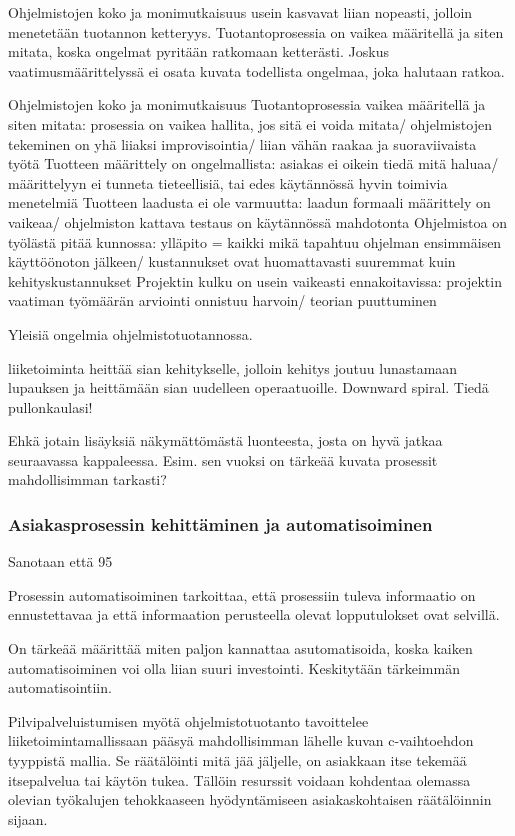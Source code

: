 \documentclass[finnish,12pt,a4paper,pdftex]{article}
\begin{document}
Ohjelmistojen koko ja monimutkaisuus usein kasvavat liian nopeasti, jolloin menetetään tuotannon ketteryys. Tuotantoprosessia on vaikea määritellä ja siten mitata, koska ongelmat pyritään ratkomaan ketterästi. Joskus vaatimusmäärittelyssä ei osata kuvata todellista ongelmaa, joka halutaan ratkoa. 

Ohjelmistojen koko ja monimutkaisuus
Tuotantoprosessia vaikea määritellä ja siten mitata: prosessia on vaikea hallita, jos sitä ei voida mitata/ ohjelmistojen tekeminen on yhä liiaksi improvisointia/ liian vähän raakaa ja suoraviivaista työtä
Tuotteen määrittely on ongelmallista: asiakas ei oikein tiedä mitä haluaa/ määrittelyyn ei tunneta tieteellisiä, tai edes käytännössä hyvin toimivia menetelmiä
Tuotteen laadusta ei ole varmuutta: laadun formaali määrittely on vaikeaa/ ohjelmiston kattava testaus on käytännössä mahdotonta
Ohjelmistoa on työlästä pitää kunnossa: ylläpito = kaikki mikä tapahtuu ohjelman ensimmäisen käyttöönoton jälkeen/ kustannukset ovat huomattavasti suuremmat kuin kehityskustannukset
Projektin kulku on usein vaikeasti ennakoitavissa: projektin vaatiman työmäärän arviointi onnistuu harvoin/ teorian puuttuminen

Yleisiä ongelmia ohjelmistotuotannossa.

liiketoiminta heittää sian kehitykselle, jolloin kehitys joutuu lunastamaan lupauksen ja heittämään sian uudelleen operaatuoille. Downward spiral. Tiedä pullonkaulasi!

Ehkä jotain lisäyksiä näkymättömästä luonteesta, josta on hyvä jatkaa seuraavassa kappaleessa. Esim. sen vuoksi on tärkeää kuvata prosessit mahdollisimman tarkasti?

\subsubsection{Asiakasprosessin kehittäminen ja automatisoiminen}

Sanotaan että 95%

Prosessin automatisoiminen tarkoittaa, että prosessiin tuleva informaatio on ennustettavaa ja että informaation perusteella olevat lopputulokset ovat selvillä. 

On tärkeää määrittää miten paljon kannattaa asutomatisoida, koska kaiken automatisoiminen voi olla liian suuri investointi. Keskitytään tärkeimmän automatisointiin. 

Pilvipalveluistumisen myötä ohjelmistotuotanto tavoittelee liiketoimintamallissaan pääsyä mahdollisimman lähelle kuvan c-vaihtoehdon tyyppistä mallia. Se räätälöinti mitä jää jäljelle, on asiakkaan itse tekemää itsepalvelua tai käytön tukea. Tällöin resurssit voidaan kohdentaa olemassa olevian työkalujen tehokkaaseen hyödyntämiseen asiakaskohtaisen räätälöinnin sijaan. 
\end{document}

